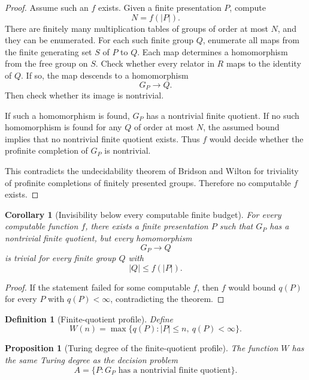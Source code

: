 \documentclass[11pt]{article}
\newtheorem{proposition}[theorem]{Proposition}
\newtheorem{corollary}[theorem]{Corollary}
\newtheorem{definition}[theorem]{Definition}
\begin{document}
\begin{proof}
Assume such an \(f\) exists. Given a finite presentation \(P\), compute
\[
N=f(|P|).
\]
There are finitely many multiplication tables of groups of order at most \(N\), and they can be enumerated. For each such finite group \(Q\), enumerate all maps from the finite generating set \(S\) of \(P\) to \(Q\). Each map determines a homomorphism from the free group on \(S\). Check whether every relator in \(R\) maps to the identity of \(Q\). If so, the map descends to a homomorphism
\[
G_P\to Q.
\]
Then check whether its image is nontrivial.

If such a homomorphism is found, \(G_P\) has a nontrivial finite quotient. If no such homomorphism is found for any \(Q\) of order at most \(N\), the assumed bound implies that no nontrivial finite quotient exists. Thus \(f\) would decide whether the profinite completion of \(G_P\) is nontrivial.

This contradicts the undecidability theorem of Bridson and Wilton for triviality of profinite completions of finitely presented groups. Therefore no computable \(f\) exists.
\end{proof}

\begin{corollary}[Invisibility below every computable finite budget]
For every computable function \(f\), there exists a finite presentation \(P\) such that \(G_P\) has a nontrivial finite quotient, but every homomorphism
\[
G_P\to Q
\]
is trivial for every finite group \(Q\) with
\[
|Q|\leq f(|P|).
\]
\end{corollary}

\begin{proof}
If the statement failed for some computable \(f\), then \(f\) would bound \(q(P)\) for every \(P\) with \(q(P)<\infty\), contradicting the theorem.
\end{proof}

\begin{definition}[Finite-quotient profile]
Define
\[
W(n)=
\max\{q(P):|P|\leq n,\ q(P)<\infty\}.
\]
\end{definition}

\begin{proposition}[Turing degree of the finite-quotient profile]
The function \(W\) has the same Turing degree as the decision problem
\[
A=\{P:G_P\text{ has a nontrivial finite quotient}\}.
\]
\end{proposition}
\end{document}
